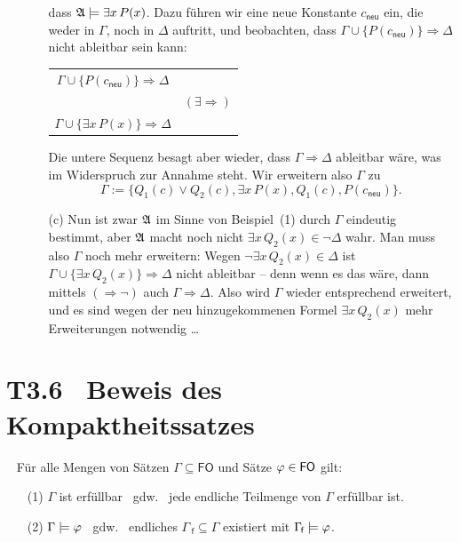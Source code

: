 \documentclass[fontsize=11pt, twoside=false, numbers=autoenddot]{scrbook}
\begin{document}
\begin{enumerate}
\begin{enumerate}
        dass $\mathfrak{A} \models \exists x\,P(x)$. Dazu führen wir eine neue Konstante
        $c_{\textsf{neu}}$ ein, die weder in $\Gamma$, noch in $\Delta$ auftritt,
        und beobachten,
        dass $\Gamma \cup \{P(c_{\textsf{neu}})\} \Rightarrow \Delta$
        nicht ableitbar sein kann:
        \par\smallskip
        \begin{center}
          \begin{tabular}{cl}
            $\Gamma \cup \{P(c_{\textsf{neu}})\} \Rightarrow \Delta$ &                        \\[-6pt]
            \hrulefill                                               & $(\exists\Rightarrow)$ \\[-2pt]
            $\Gamma \cup \{\exists x\,P(x)\} \Rightarrow \Delta$     &
          \end{tabular}
        \end{center}
        \par\smallskip
        Die untere Sequenz besagt aber wieder, dass $\Gamma \Rightarrow \Delta$
        ableitbar wäre, was im Widerspruch zur Annahme steht.
        Wir erweitern also $\Gamma$ zu
        \[
          \Gamma := \{Q_1(c) \lor Q_2(c), \exists x\,P(x), Q_1(c), P(c_{\textsf{neu}})\}.
        \]
      \item[(c)]
        Nun ist zwar $\mathfrak{A}$ im Sinne von Beispiel~(1)
        durch $\Gamma$ eindeutig bestimmt,
        aber $\mathfrak{A}$ macht noch nicht $\exists x\, Q_2(x) \in \lnot \Delta$ wahr.
        Man muss also $\Gamma$ noch mehr erweitern:
        Wegen $\lnot \exists x\, Q_2(x) \in \Delta$
        ist $\Gamma \cup \{\exists x\,Q_2(x)\} \Rightarrow \Delta$
        nicht ableitbar -- denn wenn es das wäre, dann mittels $(\Rightarrow \lnot)$
        auch $\Gamma \Rightarrow \Delta$.
        Also wird $\Gamma$ wieder entsprechend erweitert,
        und es sind wegen der neu hinzugekommenen Formel $\exists x\,Q_2(x)$
        mehr Erweiterungen notwendig \dots
    \end{enumerate}
\end{enumerate}

\section*{T3.6~ Beweis des Kompaktheitssatzes}

~
F\"ur alle Mengen von S\"atzen $\Gamma \subseteq \textsf{FO}$ und S\"atze $\varphi \in \textsf{FO}$ gilt:
%
\begin{enumerate}
  \item[(1)]
    $\Gamma$ ist erf\"ullbar
    ~gdw.~
    jede endliche Teilmenge von $\Gamma$ erf\"ullbar ist.
  \item[(2)]
    $\Gamma \models \varphi$
    ~gdw.~
    endliches $\Gamma_{\!\!\:\textsf{f}} \subseteq \Gamma$ existiert mit $\Gamma_{\!\!\:\textsf{f}} \models \varphi$.
\end{enumerate}
\end{document}
